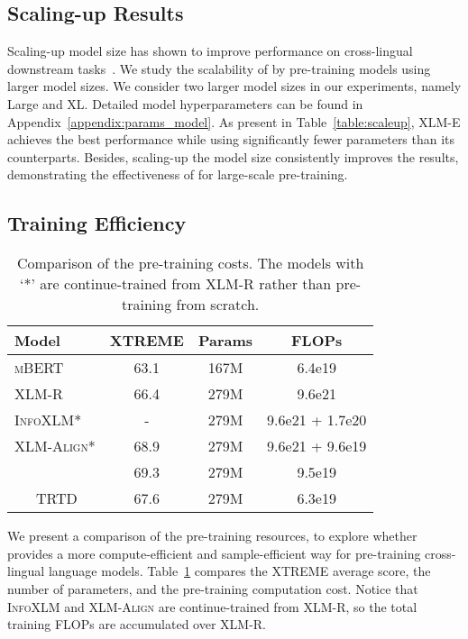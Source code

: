\documentclass[11pt]{article}
\newcommand\our{\makebox{\textsc{XLM-E}}}
\begin{document}
\subsection{Scaling-up Results}
\label{sec:scaleup}

Scaling-up model size has shown to improve performance on cross-lingual downstream tasks~\cite{mt5,xlmr-scaleup}.
We study the scalability of \our{} by pre-training \our{} models using larger model sizes. 
We consider two larger model sizes in our experiments, namely Large and XL. Detailed model hyperparameters can be found in Appendix~\ref{appendix:params_model}.
As present in Table~\ref{table:scaleup}, XLM-E achieves the best performance while using significantly fewer parameters than its counterparts. Besides, scaling-up the \our{} model size consistently improves the results, demonstrating the effectiveness of \our{} for large-scale pre-training.


\subsection{Training Efficiency}
\label{sec:eff}

\begin{table}[t]
\centering
\small
\renewcommand\tabcolsep{3.5pt}
\begin{tabular}{lccc}
\toprule
\bf Model & \bf XTREME & \bf Params & \bf FLOPs \\
\midrule
\textsc{mBERT} & 63.1 & 167M & 6.4e19 \\
XLM-R & 66.4 & 279M & 9.6e21 \\
\textsc{InfoXLM}* & - & 279M & 9.6e21 + 1.7e20 \\
\textsc{XLM-Align}* & 68.9 & 279M & 9.6e21 + 9.6e19 \\
\our{} & 69.3 & 279M & 9.5e19 \\
~~~TRTD & 67.6 & 279M & 6.3e19 \\
\bottomrule
\end{tabular}
\caption{Comparison of the pre-training costs.
The models with `*' are continue-trained from XLM-R rather than pre-training from scratch.}
\label{table:eff}
\end{table}

We present a comparison of the pre-training resources, to explore whether \our{} provides a more compute-efficient and sample-efficient way for pre-training cross-lingual language models.
Table~\ref{table:eff} compares the XTREME average score, the number of parameters, and the pre-training computation cost.
Notice that \textsc{InfoXLM} and \textsc{XLM-Align} are continue-trained from XLM-R, so the total training FLOPs are accumulated over XLM-R.
\end{document}
